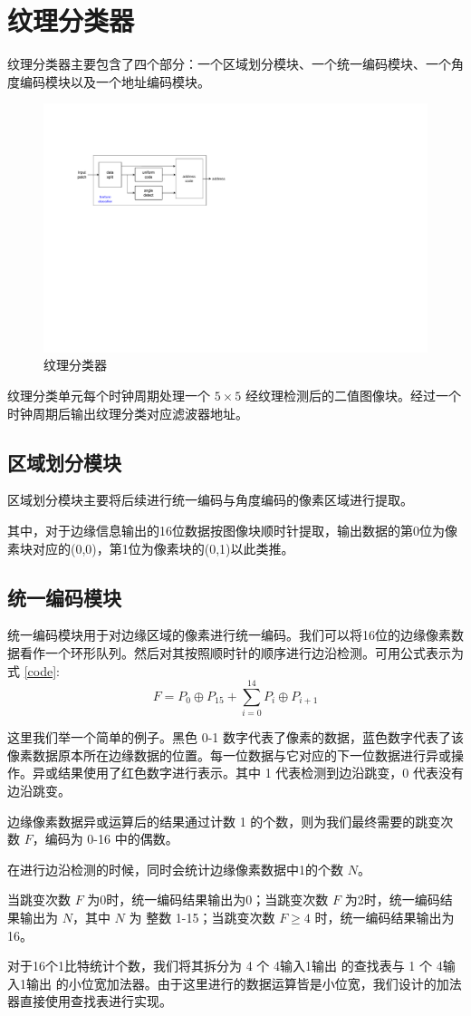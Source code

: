 \documentclass[12pt, a4paper, oneside]{ctexbook}
\begin{document}
	\section{纹理分类器}
	纹理分类器主要包含了四个部分：一个区域划分模块、一个统一编码模块、一个角度编码模块以及一个地址编码模块。
		\begin{figure}[h]	
		\centering
		\includegraphics[scale=1.0]{pic/texture_classifier.pdf}
		\caption{纹理分类器}
		\end{figure}
	纹理分类单元每个时钟周期处理一个 $5\times5$ 经纹理检测后的二值图像块。经过一个时钟周期后输出纹理分类对应滤波器地址。
	\subsection{区域划分模块}
	区域划分模块主要将后续进行统一编码与角度编码的像素区域进行提取。
	\par 其中，对于边缘信息输出的16位数据按图像块顺时针提取，输出数据的第0位为像素块对应的(0,0)，第1位为像素块的(0,1)以此类推。
	\subsection{统一编码模块}
	统一编码模块用于对边缘区域的像素进行统一编码。我们可以将16位的边缘像素数据看作一个环形队列。然后对其按照顺时针的顺序进行边沿检测。可用公式表示为式 \ref{code}:
	\begin{equation}
	F=P_{0}\oplus P_{15} + \sum_{i=0}^{14}P_i \oplus P_{i+1}
	\label{code}
	\end{equation}
	\par
	这里我们举一个简单的例子。黑色 0-1 数字代表了像素的数据，蓝色数字代表了该像素数据原本所在边缘数据的位置。每一位数据与它对应的下一位数据进行异或操作。异或结果使用了红色数字进行表示。其中 1 代表检测到边沿跳变，0 代表没有边沿跳变。\par 	边缘像素数据异或运算后的结果通过计数 1 的个数，则为我们最终需要的跳变次数 $F$，编码为 0-16 中的偶数。\par 在进行边沿检测的时候，同时会统计边缘像素数据中1的个数 $N$。\par 当跳变次数 $F$ 为0时，统一编码结果输出为0；当跳变次数 $F$ 为2时，统一编码结果输出为 $N$，其中 $N$ 为 整数 1-15；当跳变次数 $F \geq 4$ 时，统一编码结果输出为16。
	\par 对于16个1比特统计个数，我们将其拆分为 4 个 4输入1输出 的查找表与 1 个 4输入1输出 的小位宽加法器。由于这里进行的数据运算皆是小位宽，我们设计的加法器直接使用查找表进行实现。
\end{document}
